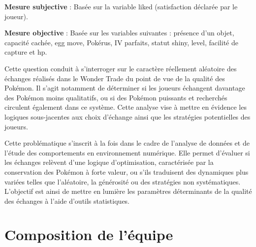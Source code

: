 \documentclass[mstat,12pt]{unswthesis}
\begin{document}
\textbf{Mesure subjective} : Basée sur la variable liked (satisfaction
déclarée par le joueur).

\medskip

\textbf{Mesure objective} : Basée sur les variables suivantes : présence
d'un objet, capacité cachée, egg move, Pokérus, IV parfaits, statut
shiny, level, facilité de capture et hp.

\bigskip

Cette question conduit à s'interroger sur le caractère réellement
aléatoire des échanges réalisés dans le Wonder Trade du point de vue de
la qualité des Pokémon. Il s'agit notamment de déterminer si les joueurs
échangent davantage des Pokémon moins qualitatifs, ou si des Pokémon
puissants et recherchés circulent également dans ce système. Cette
analyse vise à mettre en évidence les logiques sous-jacentes aux choix
d'échange ainsi que les stratégies potentielles des joueurs.

\medskip

Cette problématique s'inscrit à la fois dans le cadre de l'analyse de
données et de l'étude des comportements en environnement numérique. Elle
permet d'évaluer si les échanges relèvent d'une logique d'optimisation,
caractérisée par la conservation des Pokémon à forte valeur, ou s'ils
traduisent des dynamiques plus variées telles que l'aléatoire, la
générosité ou des stratégies non systématiques. L'objectif est ainsi de
mettre en lumière les paramètres déterminants de la qualité des échanges
à l'aide d'outils statistiques.

\bigskip 
\bigskip

\medskip

\section{Composition de l'équipe}\label{composition-de-luxe9quipe}
\end{document}
